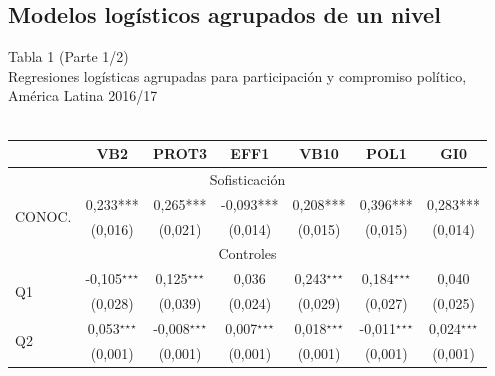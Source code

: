 \documentclass[a4paper]{tufte-handout}
\begin{document}
\subsection[Modelos logísticos agrupados de un nivel] {Modelos logísticos agrupados de un nivel}


\begin{table}[h]
  \centering
  \selectfont
   \smallskip\noindent\small Tabla 1 (Parte 1/2) \\ Regresiones logísticas agrupadas para participación y compromiso político, América Latina 2016/17  \\~\\
  \begin{tabular}{l c c c c c c}
    \toprule
     & VB2 & PROT3 & EFF1 & VB10 & POL1 & GI0 \\ \midrule
    \multicolumn{7}{c}{Sofisticación} \\ \midrule
    \multirow{2}{*}{CONOC.} & 0,233*** & 0,265*** & -0,093*** & 0,208*** & 0,396*** & 0,283*** \\
    & {\scriptsize (0,016)} & {\scriptsize (0,021)} & {\scriptsize (0,014)} & {\scriptsize (0,015)} & {\scriptsize (0,015)} & {\scriptsize (0,014)} \\ \midrule
    \multicolumn{7}{c}{Controles} \\ \midrule
    \multirow{2}{*}{Q1} & -0,105$^\star$$^\star$$^\star$ & 0,125$^\star$$^\star$$^\star$ & 0,036 & 0,243$^\star$$^\star$$^\star$ & 0,184$^\star$$^\star$$^\star$ & 0,040 \\
    & {\scriptsize (0,028)} & {\scriptsize (0,039)} & {\scriptsize (0,024)} & {\scriptsize (0,029)} & {\scriptsize (0,027)} & {\scriptsize (0,025)} \\ 
    \multirow{2}{*}{Q2} & 0,053$^\star$$^\star$$^\star$ & -0,008$^\star$$^\star$$^\star$ & 0,007$^\star$$^\star$$^\star$ & 0,018$^\star$$^\star$$^\star$ & -0,011$^\star$$^\star$$^\star$ & 0,024$^\star$$^\star$$^\star$ \\
    & {\scriptsize (0,001)} & {\scriptsize (0,001)} & {\scriptsize (0,001)} & {\scriptsize (0,001)} & {\scriptsize (0,001)} & {\scriptsize (0,001)} \\

\end{tabular}
\end{table}
\end{document}

